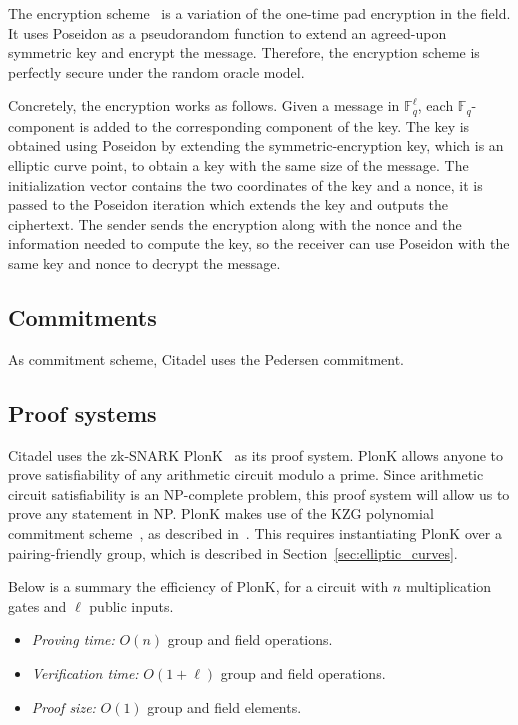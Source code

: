 The encryption scheme~\cite{duskDmitry} is a variation of the one-time pad encryption in the field. It uses Poseidon as a pseudorandom function to extend an agreed-upon symmetric key and encrypt the message. Therefore, the encryption scheme is perfectly secure under the random oracle model. 

Concretely, the encryption works as follows. Given a message in $\mathbb{F}_q^{\ell}$, each $\mathbb{F}_q$-component is added to  the corresponding component of the key. The key is obtained using Poseidon by extending the symmetric-encryption key, which is an elliptic curve point, 
to obtain a key with the same size of the message. The initialization vector contains the two coordinates of the key and a nonce, it is passed to the Poseidon iteration which extends the key and outputs the ciphertext. The sender sends the encryption along with the nonce and the information needed to compute the key, so the receiver can use Poseidon with the same key and nonce to decrypt the message.

\subsection{Commitments}

As commitment scheme, Citadel uses the Pedersen commitment.


\subsection{Proof systems}\label{sec:proof_system}

Citadel uses the zk-SNARK PlonK~\cite{gabizon2019plonk} as its proof system. PlonK allows anyone to prove satisfiability of any arithmetic circuit modulo a prime. Since arithmetic circuit satisfiability is an NP-complete problem, this proof system will allow us to prove any statement in NP. 
%
PlonK makes use of the KZG polynomial commitment scheme~\cite{kate2010constant}, as described in~\cite{gabizon2019plonk}. This requires instantiating PlonK over a pairing-friendly group, which is described in Section~\ref{sec:elliptic_curves}.

Below is a summary the efficiency of PlonK, for a circuit with $n$ multiplication gates and $\ell$ public inputs.
\begin{itemize}
	\item \emph{Proving time:} $O(n)$ group and field operations. 
	\item \emph{Verification time:} $O(1+\ell)$ group and field operations.
	\item \emph{Proof size:} $O(1)$ group and field elements.
\end{itemize}

